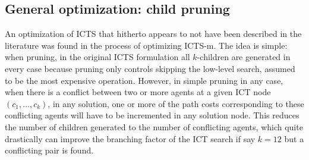 \documentclass[english]{article}
\begin{document}
	\subsection{General optimization: child pruning}
An optimization of ICTS that hitherto appears to not have been described in the literature was found in the process of optimizing ICTS-m. The idea is simple: when pruning, in the original ICTS formulation all $k$-children are generated in every case because pruning only controls skipping the low-level search, assumed to be the most expensive operation. However, in simple pruning in any case, when there is a conflict between two or more agents at a given ICT node $(c_1,\ldots,c_k)$, in any solution, one or more of the path costs corresponding to these conflicting agents will have to be incremented in any solution node. This reduces the number of children generated to the number of conflicting agents, which quite drastically can improve the branching factor of the ICT search if say $k = 12$ but a conflicting pair is found.
\end{document}
